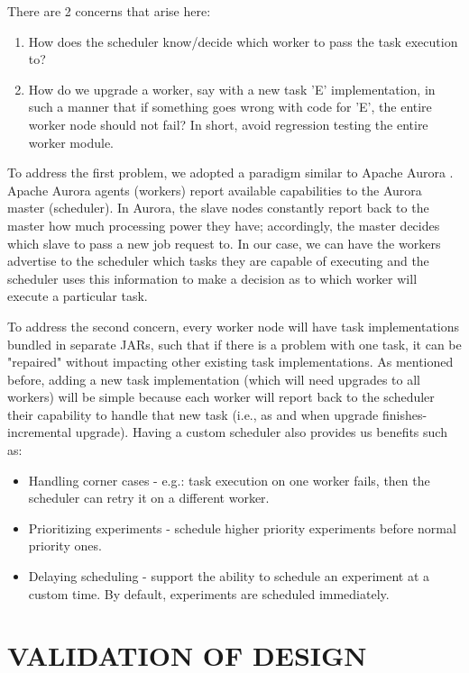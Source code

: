 \documentclass[sigconf]{acmart}
\begin{document}
There are 2 concerns that arise here:

\begin{enumerate}
\item How does the scheduler know/decide which worker to pass the task execution to?
\item How do we upgrade a worker, say with a new task 'E' implementation, in such a manner that if something goes wrong with code for 'E', the entire worker node should not fail? In short, avoid regression testing the entire worker module.
\end{enumerate}

To address the first problem, we adopted a paradigm similar to Apache Aurora \cite{apacheAurora}.  Apache Aurora agents (workers) report available capabilities to the Aurora master (scheduler). In Aurora, the slave nodes constantly report back to the master how much processing power they have; accordingly, the master decides which slave to pass a new job request to. In our case, we can have the workers advertise to the scheduler which tasks they are capable of executing and the scheduler uses this information to make a decision as to which worker will execute a particular task.

To address the second concern, every worker node will have task implementations bundled in separate JARs, such that if there is a problem with one task, it can be "repaired" without impacting other existing task implementations. As mentioned before, adding a new task implementation (which will need upgrades to all workers) will be simple because each worker will report back to the scheduler their capability to handle that new task (i.e., as and when upgrade finishes-incremental upgrade). Having a custom scheduler also provides us benefits such as:

\begin{itemize}
\item Handling corner cases - e.g.: task execution on one worker fails, then the scheduler can retry it on a different worker.
\item Prioritizing experiments - schedule higher priority experiments before normal priority ones.
\item Delaying scheduling - support the ability to schedule an experiment at a custom time. By default, experiments are scheduled immediately.
\end{itemize}

\section{VALIDATION OF DESIGN}
\end{document}
